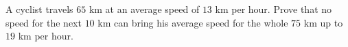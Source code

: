 A cyclist travels $65$ km at an average speed of $13$ km per hour. Prove that no speed for the next $10$ km can bring his average speed for the whole $75$ km up to $19$ km per hour.
